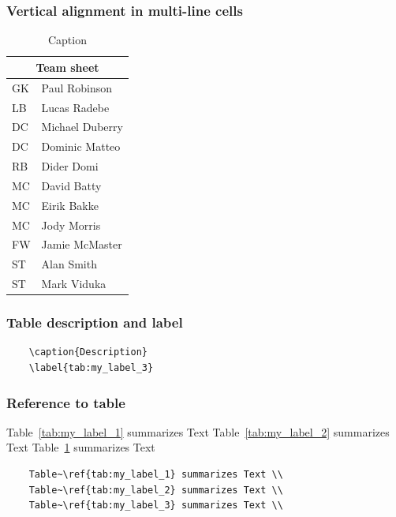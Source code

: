 \subsubsection{Vertical alignment in multi-line cells}


\begin{table}[htp]
    \centering
\begin{tabular}{ |l|l| }
  \hline
  \multicolumn{2}{|c|}{Team sheet} \\
  \hline
  GK & Paul Robinson \\
  LB & Lucas Radebe \\
  DC & Michael Duberry \\
  DC & Dominic Matteo \\
  RB & Dider Domi \\
  MC & David Batty \\
  MC & Eirik Bakke \\
  MC & Jody Morris \\
  FW & Jamie McMaster \\
  ST & Alan Smith \\
  ST & Mark Viduka \\
  \hline
\end{tabular}
    \caption{Caption}
    \label{tab:my_label_3}
\end{table}


\subsubsection{Table description and label}
\begin{verbatim}
    \caption{Description}
    \label{tab:my_label_3}
\end{verbatim}

\subsubsection{Reference to table}
Table~\ref{tab:my_label_1} summarizes Text
\newline
Table~\ref{tab:my_label_2} summarizes Text
\newline
Table~\ref{tab:my_label_3} summarizes Text
\newline
\begin{verbatim}
    Table~\ref{tab:my_label_1} summarizes Text \\
    Table~\ref{tab:my_label_2} summarizes Text \\
    Table~\ref{tab:my_label_3} summarizes Text \\
\end{verbatim}


